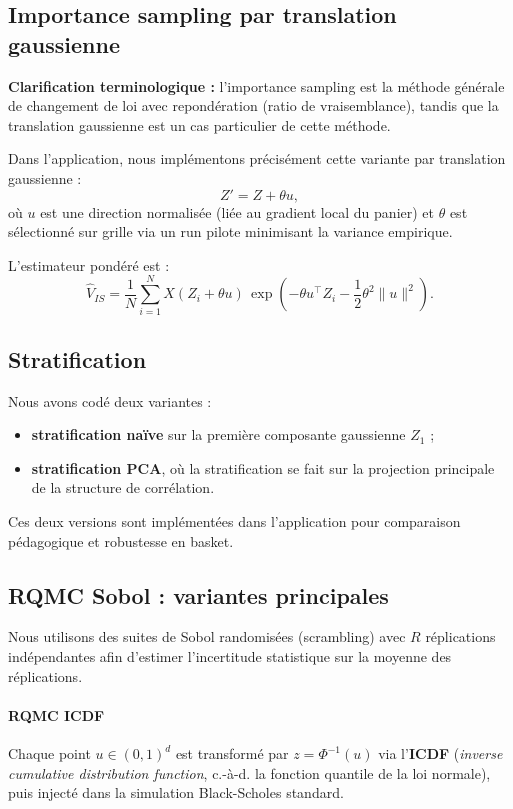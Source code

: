 ﻿\documentclass[11pt,a4paper]{article}
\begin{document}
\subsection{Importance sampling par translation gaussienne}

\textbf{Clarification terminologique :} l'importance sampling est la méthode générale de changement de loi avec repondération (ratio de vraisemblance), tandis que la translation gaussienne est un cas particulier de cette méthode.

Dans l'application, nous implémentons précisément cette variante par translation gaussienne :
\begin{equation}
Z' = Z + \theta u,
\end{equation}
où $u$ est une direction normalisée (liée au gradient local du panier) et $\theta$ est sélectionné sur grille via un run pilote minimisant la variance empirique.

L'estimateur pondéré est :
\begin{equation}
\hat V_{IS}=\frac{1}{N}\sum_{i=1}^{N} X(Z_i+\theta u)\,\exp\left(-\theta u^\top Z_i-\frac{1}{2}\theta^2\|u\|^2\right).
\end{equation}

\subsection{Stratification}

Nous avons codé deux variantes :
\begin{itemize}
    \item \textbf{stratification naïve} sur la première composante gaussienne $Z_1$ ;
    \item \textbf{stratification PCA}, où la stratification se fait sur la projection principale de la structure de corrélation.
\end{itemize}
Ces deux versions sont implémentées dans l'application pour comparaison pédagogique et robustesse en basket.

\subsection{RQMC Sobol : variantes principales}

Nous utilisons des suites de Sobol randomisées (scrambling) avec $R$ réplications indépendantes afin d'estimer l'incertitude statistique sur la moyenne des réplications.

\paragraph{RQMC ICDF}
Chaque point $u\in(0,1)^d$ est transformé par $z=\Phi^{-1}(u)$ via l'\textbf{ICDF} (\textit{inverse cumulative distribution function}, c.-à-d. la fonction quantile de la loi normale), puis injecté dans la simulation Black-Scholes standard.
\end{document}
